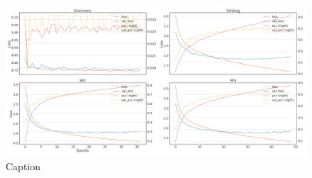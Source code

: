 \begin{figure}[!htb]
    \centering
    \includegraphics[width=\textwidth]{gfx/bpic2015_4/windowed_loss_acc_curve.png}
    \caption{Caption}
    \label{fig:my_label}
\end{figure}
\FloatBarrier

